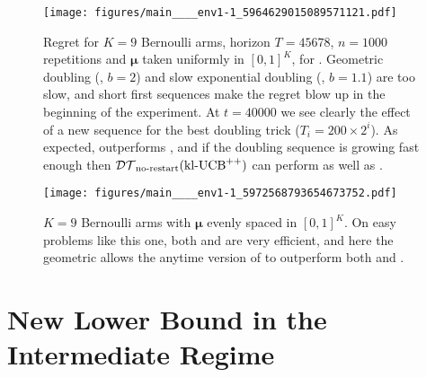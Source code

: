 \documentclass[12pt]{colt2018} %
\begin{document}
%
%
\begin{figure}[H]
    \centering
    \texttt{[image: figures/main\_\_\_\_env1-1\_5964629015089571121.pdf]}
    \caption{Regret for $K=9$ Bernoulli arms, horizon $T=45678$, $n=1000$ repetitions and $\boldsymbol{\mu}$ taken uniformly in $[0,1]^K$, for \DTnr. Geometric doubling (\eg, $b=2$) and slow exponential doubling (\eg, $b=1.1$) are too slow, and short first sequences make the regret blow up in the beginning of the experiment. At $t=40000$ we see clearly the effect of a new sequence for the best doubling trick ($T_i = 200 \times 2^i$). As expected, \KLUCBpp{} outperforms \KLUCB, and if the doubling sequence is growing fast enough then $\mathcal{DT}_{\text{no-restart}}(\mathrm{kl}\text{-}\mathrm{UCB}^{++})$ can perform as well as \KLUCB.}
    \label{fig:bernoulliBandits_DoublingTrick_noRestart_BayesianProblem}
    \vspace*{-15pt}  %
\end{figure}
%
%
%
\begin{figure}[H]
    \centering
    \texttt{[image: figures/main\_\_\_\_env1-1\_5972568793654673752.pdf]}
    \caption{$K=9$ Bernoulli arms with $\boldsymbol{\mu}$ evenly spaced in $[0,1]^K$. On easy problems like this one, both \KLUCB{} and \KLUCBpp{} are very efficient, and here the geometric allows the \DTnr{} anytime version of \KLUCBpp{} to outperform both \KLUCB{} and \KLUCBpp.}
    \label{fig:bernoulliBandits_DoublingTrick_noRestart_fixedProblem}
\end{figure}


\hr{}

\section{New Lower Bound in the Intermediate Regime}
\end{document}
